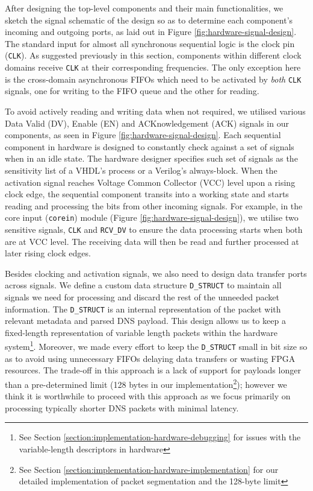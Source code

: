\documentclass[a4paper]{report}
\newcommand{\proglang}{\textsf}
\newcommand{\code}{\texttt}
\begin{document}
After designing the top-level components and their main functionalities, we sketch the signal schematic of the design so as to determine each component's incoming and outgoing ports, as laid out in Figure \ref{fig:hardware-signal-design}. The standard input for almost all synchronous sequential logic is the clock pin (\code{CLK}). As suggested previously in this section, components within different clock domains receive \code{CLK} at their corresponding frequencies. The only exception here is the cross-domain asynchronous FIFOs which need to be activated by \textit{both} \code{CLK} signals, one for writing to the FIFO queue and the other for reading.

To avoid actively reading and writing data when not required, we utilised various Data Valid (DV), Enable (EN) and ACKnowledgement (ACK) signals in our components, as seen in Figure \ref{fig:hardware-signal-design}. Each sequential component in hardware is designed to constantly check against a set of signals when in an idle state. The hardware designer specifies such set of signals as the sensitivity list of a \proglang{VHDL}'s process or a \proglang{Verilog}'s always-block. When the activation signal reaches Voltage Common Collector (VCC) level upon a rising clock edge, the sequential component transits into a working state and starts reading and processing the bits from other incoming signals. For example, in the core input (\code{corein}) module (Figure \ref{fig:hardware-signal-design}), we utilise two sensitive signals, \code{CLK} and \code{RCV\_DV} to ensure the data processing starts when both are at VCC level. The receiving data will then be read and further processed at later rising clock edges.

Besides clocking and activation signals, we also need to design data transfer ports across signals. We define a custom data structure \code{D\_STRUCT} to maintain all signals we need for processing and discard the rest of the unneeded packet information. The \code{D\_STRUCT} is an internal representation of the packet with relevant metadata and parsed DNS payload. This design allows us to keep a fixed-length representation of variable length packets within the hardware system\footnote{See Section \ref{section:implementation-hardware-debugging} for issues with the variable-length descriptors in hardware}. Moreover, we made every effort to keep the \code{D\_STRUCT} small in bit size so as to avoid using unnecessary FIFOs delaying data transfers or wasting FPGA resources. The trade-off in this approach is a lack of support for payloads longer than a pre-determined limit (128 bytes in our implementation\footnote{See Section \ref{section:implementation-hardware-implementation} for our detailed implementation of packet segmentation and the 128-byte limit}); however we think it is worthwhile to proceed with this approach as we focus primarily on processing typically shorter DNS packets with minimal latency.
\end{document}
